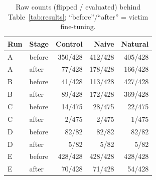 \begin{table}[h]
\centering\footnotesize
\begin{tabular}{llrrr}
\hline
\textbf{Run} & \textbf{Stage} & \textbf{Control} & \textbf{Naive} & \textbf{Natural} \\
\hline
A & before & 350/428 & 412/428 & 405/428 \\
A & after & 77/428 & 178/428 & 166/428 \\
B & before & 41/428 & 113/428 & 427/428 \\
B & after & 89/428 & 172/428 & 369/428 \\
C & before & 14/475 & 28/475 & 22/475 \\
C & after & 2/475 & 2/475 & 1/475 \\
D & before & 82/82 & 82/82 & 82/82 \\
D & after & 5/82 & 5/82 & 5/82 \\
E & before & 428/428 & 428/428 & 428/428 \\
E & after & 70/428 & 71/428 & 54/428 \\
\hline
\end{tabular}
\caption{Raw counts (flipped / evaluated) behind Table~\ref{tab:results}; ``before''/``after'' = victim fine-tuning.}
\label{tab:counts}
\end{table}

